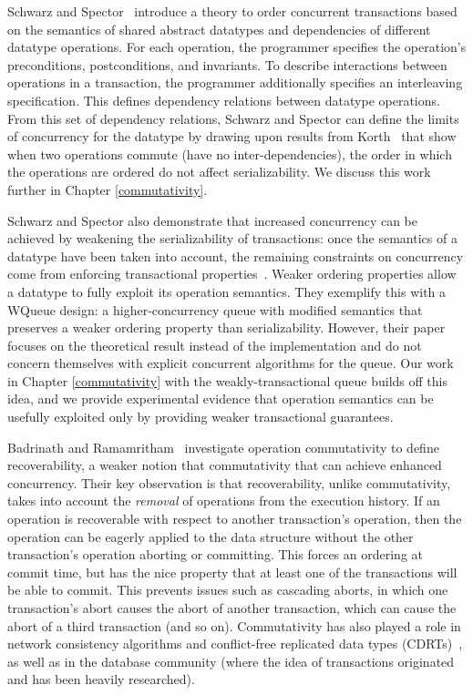 Schwarz and Spector~\cite{schwarz} introduce a theory to order concurrent transactions based on the semantics of shared abstract datatypes and dependencies of different datatype operations. For each operation, the programmer specifies the operation's preconditions, postconditions, and invariants. To describe interactions between operations in a transaction, the programmer additionally specifies an interleaving specification. This defines dependency relations between datatype operations. From this set of dependency relations, Schwarz and Spector can define the limits of concurrency for the datatype by drawing upon results from Korth~\cite{korth} that show when two operations commute (have no inter-dependencies), the order in which the operations are ordered do not affect serializability. We discuss this work further in Chapter \ref{commutativity}. 

Schwarz and Spector also demonstrate that increased concurrency can be achieved by weakening the serializability of transactions: once the semantics of a datatype have been taken into account, the remaining constraints on concurrency come from enforcing transactional properties~\cite{kung}. Weaker ordering properties allow a datatype to fully exploit its operation semantics. They exemplify this with a WQueue design: a higher-concurrency queue with modified semantics that preserves a weaker ordering property than serializability. However, their paper focuses on the theoretical result instead of the implementation and do not concern themselves with explicit concurrent algorithms for the queue. Our work in Chapter \ref{commutativity} with the weakly-transactional queue builds off this idea, and we provide experimental evidence that operation semantics can be usefully exploited only by providing weaker transactional guarantees.

Badrinath and Ramamritham~\cite{badrinath} investigate operation commutativity to define recoverability, a weaker notion that commutativity that can achieve enhanced concurrency. Their key observation is that recoverability, unlike commutativity, takes into account the \emph{removal} of operations from the execution history. If an operation is recoverable with respect to another transaction's operation, then the operation can be eagerly applied to the data structure without the other transaction's operation aborting or committing. This forces an ordering at commit time, but has the nice property that at least one of the transactions will be able to commit. This prevents issues such as cascading aborts, in which one transaction's abort causes the abort of another transaction, which can cause the abort of a third transaction (and so on).
Commutativity has also played a role in network consistency algorithms and conflict-free replicated data types (CDRTs)~\cite{CRDT}, as well as in the database community (where the idea of transactions originated and has been heavily researched).

